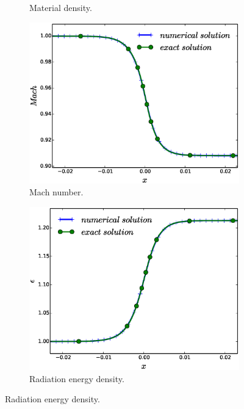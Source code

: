 \documentclass[times,doublespace]{fldauth}%
\begin{document}
\begin{figure}[h]
\begin{subfigure}{0.49\textwidth}
    \caption{Material density.}\label{fig:mach-1p05-cst-xs-density}
    \end{subfigure}
    \begin{subfigure}{0.49\textwidth}
    \includegraphics[width=\linewidth]{figures/cst-xs/mach-1p05/mass-diff-mach-1p05-mach-number-nel-250-plot.eps}
    \caption{Mach number.}\label{fig:mach-1p05-cst-xs-mach}
    \end{subfigure}
    \begin{subfigure}{0.49\textwidth}
    \includegraphics[width=\linewidth]{figures/cst-xs/mach-1p05/mass-diff-mach-1p05-radiation-nel-250-plot.eps}
    \caption{Radiation energy density.}\label{fig:mach-1p05-cst-xs-radiation}

\end{subfigure}
\end{figure}
\end{document}
